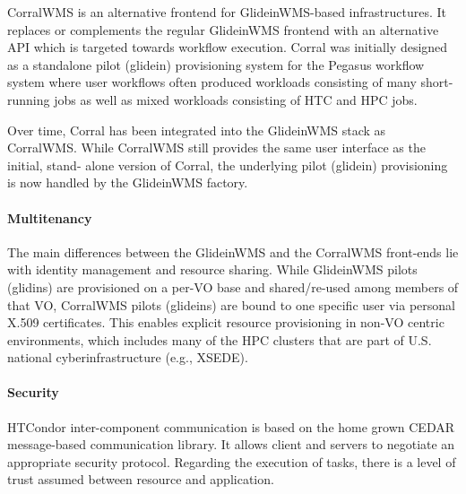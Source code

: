 \documentclass{sig-alternate}
\begin{document}
CorralWMS is an alternative frontend for GlideinWMS-based infrastructures. It
replaces or complements the regular GlideinWMS frontend with an alternative
API which is targeted towards workflow execution. Corral was initially designed
as a standalone pilot (glidein) provisioning system for the Pegasus workflow
system where user workflows often produced workloads consisting of many
short-running jobs as well as mixed workloads consisting of HTC and HPC jobs.

Over time, Corral has been integrated into the GlideinWMS stack as CorralWMS.
While CorralWMS still provides the same user interface as the initial, stand-
alone version of Corral, the underlying pilot (glidein) provisioning is now
handled by the GlideinWMS factory.


\paragraph{Multitenancy}

The main differences between the GlideinWMS and the CorralWMS front-ends lie
with identity management and resource sharing. While GlideinWMS pilots
(glidins) are provisioned on a per-VO base and shared/re-used among members of
that VO, CorralWMS pilots (glideins) are bound to one specific user via
personal X.509 certificates. This enables explicit resource provisioning in
non-VO centric environments, which includes many of the HPC clusters that are
part of U.S. national cyberinfrastructure (e.g., XSEDE).


\paragraph{Security}

HTCondor inter-component communication is based on the home grown CEDAR
message-based communication library. It allows client and servers to negotiate
an appropriate security protocol. Regarding the execution of tasks, there is a
level of trust assumed between resource and application.
\end{document}
